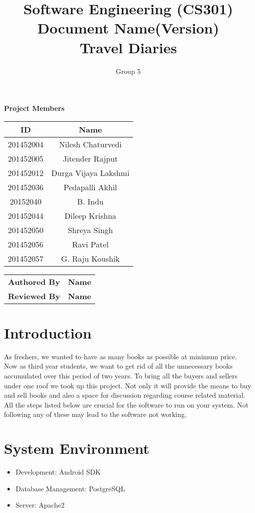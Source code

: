 \documentclass[]{article}
\title{Software Engineering (CS301)\\ Document Name(Version)\\Travel Diaries}
\author{Group 5}
\begin{document}
\maketitle

\begin{center}
\textbf{Project Members}\\
\vspace*{.6cm}
\begin{tabular}{|c|c|}
\hline
\textbf{ID} & \textbf{Name}\\
\hline
\hline
201452004 & Nilesh Chaturvedi\\
\hline
201452005 & Jitender Rajput\\
\hline
201452012 & Durga Vijaya Lakshmi\\
\hline
201452036 & Pedapalli Akhil\\
\hline
20152040 & B. Indu\\
\hline
201452044 & Dileep Krishna\\
\hline
201452050 & Shreya Singh\\
\hline
201452056 & Ravi Patel\\
\hline
201452057 & G. Raju Koushik\\
\hline
\end{tabular}

\vspace*{1cm}

\begin{tabular}{|c|c|}
\hline
\textbf{Authored By} & \textbf{Name}\\
\textbf{Reviewed By} & \textbf{Name}\\
\hline
\end{tabular}
\end{center}
\newpage
\tableofcontents
\newpage


\section{Introduction}
As freshers, we wanted to have as many books as possible at minimum price. Now as third year students, we want to get rid of all the unnecessary books accumulated over this period of two years. To bring all the buyers and sellers under one roof we took up this project. Not only it will provide the means to buy and sell books and also a space for discussion regarding course related material.
All the steps listed below are crucial for the software to run on your system. Not following any of these may lead to the software not working.
\section{System Environment}
\begin{itemize}
\item Development: Android SDK
\item Database Management: PostgreSQL 
\item Server: Apache2
\end{itemize}
\end{document}
